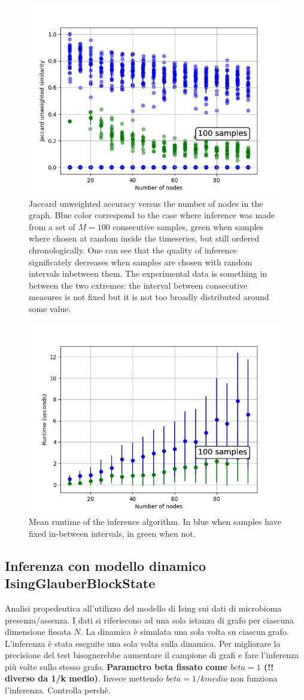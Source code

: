 \documentclass{article}
\begin{document}
\begin{figure}[H]
    \centering
    \includegraphics[width=0.9\linewidth]{images/jaccard_vs_nodes_100_samples.png}
    \caption{Jaccard unweighted accuracy versus the number of nodes in the graph. Blue color correspond to the case where inference was made from a set of $M= 100$ consecutive samples, green when samples where chosen at random inside the timeseries, but still ordered chronologically. One can see that the quality of inference significately decreases when samples are chosen with random intervals inbetween them. The experimental data is something in between the two extremes: the interval between consecutive measures is not fixed but it is not too broadly distributed around some value.}
    \label{fig:enter-label}
\end{figure}
\begin{figure}[H]
    \centering
    \includegraphics[width=0.5\linewidth]{images/runtime_vs_nodes_100_samples.png}
    \caption{Mean runtime of the inference algorithm. In blue when samples have fixed in-between intervals, in green when not.}
    \label{fig:enter-label}
\end{figure}
\subsection{Inferenza con modello dinamico IsingGlauberBlockState}
Analisi propedeutica all'utilizzo del modello di Ising sui dati di microbioma presenza/assenza.
I dati si riferiscono ad una sola istanza di grafo per ciascuna dimensione fissata $N$. La dinamica è simulata una sola volta su ciascun grafo. L'inferenza è stata eseguite una sola volta sulla dinamica. Per migliorare la precisione del test bisognerebbe aumentare il campione di grafi e fare l'inferenza più volte sullo stesso grafo.
\textbf{Parametro beta fissato come $beta = 1$ (!! diverso da 1/k medio)}.
Invece mettendo $beta = 1/k medio$ non funziona l'inferenza. Controlla perchè.
\end{document}
